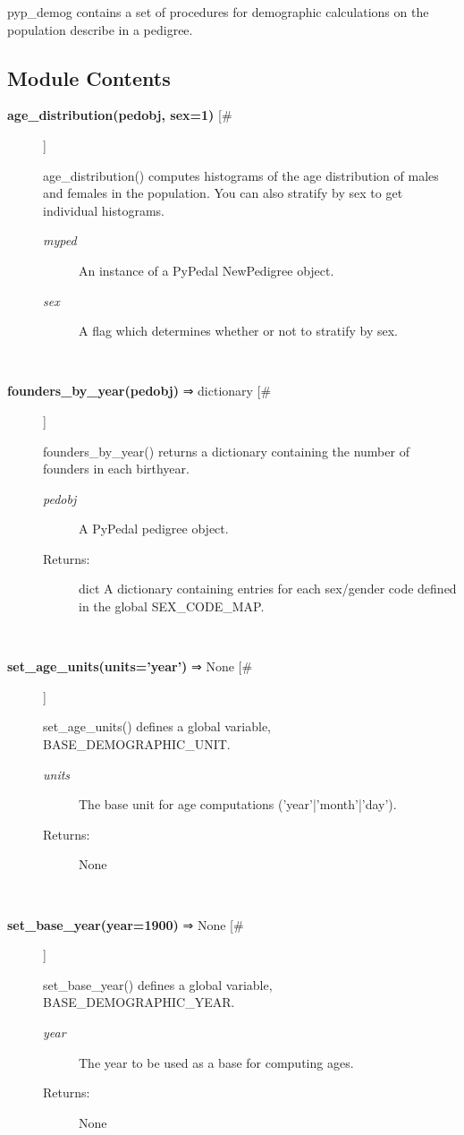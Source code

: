 \par pyp\_demog contains a set of procedures for demographic calculations on the
population describe in a pedigree.
\subsection*{Module Contents}
\begin{description}
\item[\textbf{age\_distribution(pedobj, sex=1)} [\#]
]
\par age\_distribution() computes histograms of the age distribution of
males and females in the population.  You can also stratify by
sex to get individual histograms.
\begin{description}
\item[\textit{myped}
]
An instance of a PyPedal NewPedigree object.
\item[\textit{sex}
]
A flag which determines whether or not to stratify by sex.
\end{description}\\

\item[\textbf{founders\_by\_year(pedobj)} ⇒ dictionary [\#]
]
\par founders\_by\_year() returns a dictionary containing the number of founders in each
birthyear.
\begin{description}
\item[\textit{pedobj}
]
A PyPedal pedigree object.
\item[Returns:
]
dict A dictionary containing entries for each sex/gender code defined in the global SEX\_CODE\_MAP.
\end{description}\\

\item[\textbf{set\_age\_units(units='year')} ⇒ None [\#]
]
\par set\_age\_units() defines a global variable, BASE\_DEMOGRAPHIC\_UNIT.
\begin{description}
\item[\textit{units}
]
The base unit for age computations ('year'|'month'|'day').
\item[Returns:
]
None
\end{description}\\

\item[\textbf{set\_base\_year(year=1900)} ⇒ None [\#]
]
\par set\_base\_year() defines a global variable, BASE\_DEMOGRAPHIC\_YEAR.
\begin{description}
\item[\textit{year}
]
The year to be used as a base for computing ages.
\item[Returns:
]
None
\end{description}\\


\end{description}

